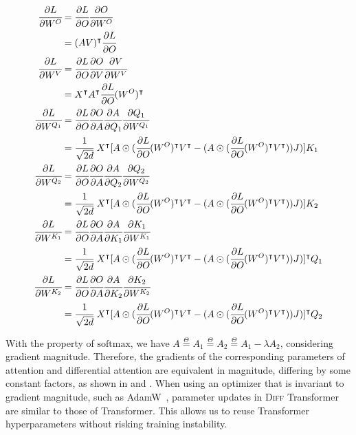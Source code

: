 \documentclass{article}
\newcommand{\softmax}{\mathrm{softmax}}
\newcommand\ourattn{differential attention}
\newcommand\diff{\textsc{Diff} Transformer}
\begin{document}
\begin{equation}
\begin{aligned}
\label{eq:attngrad}
\cfrac{\partial L}{\partial W^O} &= \cfrac{\partial L}{\partial O} \cfrac{\partial O}{\partial W^O} \\
&= (AV)^{\intercal} \cfrac{\partial L}{\partial O} \\
\cfrac{\partial L}{\partial W^V} &= \cfrac{\partial L}{\partial O} \cfrac{\partial O}{\partial V} \cfrac{\partial V}{\partial W^V} \\
&= X^{\intercal} A^{\intercal} \cfrac{\partial L}{\partial O} (W^O)^{\intercal}  \\
\cfrac{\partial L}{\partial W^{Q_1}} &= \cfrac{\partial L}{\partial O} \cfrac{\partial O}{\partial A} \cfrac{\partial A}{\partial Q_1} \cfrac{\partial Q_1}{\partial W^{Q_1}} \\
&= \cfrac{1}{\sqrt{2d}} ~ X^{\intercal} [A \odot (\cfrac{\partial L}{\partial O} (W^O)^{\intercal} V^{\intercal} - (A \odot (\cfrac{\partial L}{\partial O} (W^O)^{\intercal} V^{\intercal})) J)] K_1 \\
\cfrac{\partial L}{\partial W^{Q_2}} &= \cfrac{\partial L}{\partial O} \cfrac{\partial O}{\partial A} \cfrac{\partial A}{\partial Q_2} \cfrac{\partial Q_2}{\partial W^{Q_2}} \\
&= \cfrac{1}{\sqrt{2d}} ~ X^{\intercal} [A \odot (\cfrac{\partial L}{\partial O} (W^O)^{\intercal} V^{\intercal} - (A \odot (\cfrac{\partial L}{\partial O} (W^O)^{\intercal} V^{\intercal})) J)] K_2 \\
\cfrac{\partial L}{\partial W^{K_1}} &= \cfrac{\partial L}{\partial O} \cfrac{\partial O}{\partial A} \cfrac{\partial A}{\partial K_1} \cfrac{\partial K_1}{\partial W^{K_1}} \\
&= \cfrac{1}{\sqrt{2d}} ~ X^{\intercal} [A \odot (\cfrac{\partial L}{\partial O} (W^O)^{\intercal} V^{\intercal} - (A \odot (\cfrac{\partial L}{\partial O} (W^O)^{\intercal} V^{\intercal})) J)]^{\intercal} Q_1 \\
\cfrac{\partial L}{\partial W^{K_2}} &= \cfrac{\partial L}{\partial O} \cfrac{\partial O}{\partial A} \cfrac{\partial A}{\partial K_2} \cfrac{\partial K_2}{\partial W^{K_2}} \\
&= \cfrac{1}{\sqrt{2d}} ~ X^{\intercal} [A \odot (\cfrac{\partial L}{\partial O} (W^O)^{\intercal} V^{\intercal} - (A \odot (\cfrac{\partial L}{\partial O} (W^O)^{\intercal} V^{\intercal})) J)]^{\intercal} Q_2 \\
\end{aligned}    
\end{equation}

With the property of $\softmax$, we have $A \overset{\Theta}{=} A_1 \overset{\Theta}{=} A_2 \overset{\Theta}{=} A_1 - \lambda A_2$, considering gradient magnitude. Therefore, the gradients of the corresponding parameters of attention and \ourattn{} are equivalent in magnitude, differing by some constant factors, as shown in  and . When using an optimizer that is invariant to gradient magnitude, such as AdamW~\citep{adamw}, parameter updates in \diff{} are similar to those of Transformer. This allows us to reuse Transformer hyperparameters without risking training instability.
\end{document}
